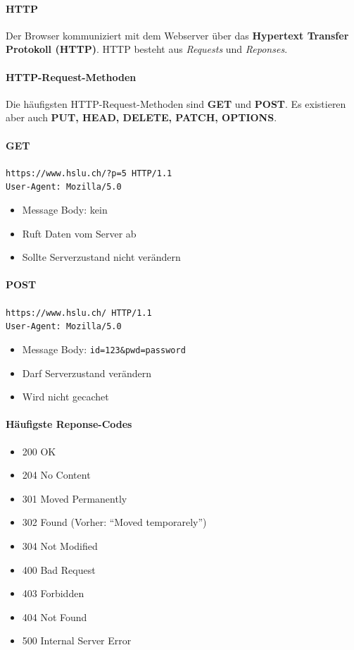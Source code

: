 \documentclass[10pt,a4paper]{article}
\begin{document}
\paragraph*{HTTP}Der Browser kommuniziert mit dem Webserver über das \textbf{Hypertext Transfer Protokoll (HTTP)}. HTTP besteht aus \textsl{Requests} und \textsl{Reponses}.

\paragraph*{HTTP-Request-Methoden}Die häufigsten HTTP-Request-Methoden sind \textbf{GET} und \textbf{POST}.
Es existieren aber auch \textbf{PUT, HEAD, DELETE, PATCH, OPTIONS}.

\paragraph*{GET}\verb|https://www.hslu.ch/?p=5 HTTP/1.1|\\
\verb|User-Agent: Mozilla/5.0|
\begin{itemize}[noitemsep,topsep=0pt,leftmargin=*]
    \item Message Body: kein
    \item Ruft Daten vom Server ab
    \item Sollte Serverzustand nicht verändern
\end{itemize}

\paragraph*{POST}\verb|https://www.hslu.ch/ HTTP/1.1|\\
\verb|User-Agent: Mozilla/5.0|
\begin{itemize}[noitemsep,topsep=0pt,leftmargin=*]
    \item Message Body: \verb|id=123&pwd=password|
    \item Darf Serverzustand verändern
    \item Wird nicht gecachet
\end{itemize}

\paragraph*{Häufigste Reponse-Codes}
\begin{itemize}[noitemsep,topsep=0pt,leftmargin=*]
    \item 200 OK
    \item 204 No Content
    \item 301 Moved Permanently
    \item 302 Found (Vorher: "`Moved temporarely"')
    \item 304 Not Modified
    \item 400 Bad Request
    \item 403 Forbidden
    \item 404 Not Found
    \item 500 Internal Server Error
\end{itemize}
\end{document}
